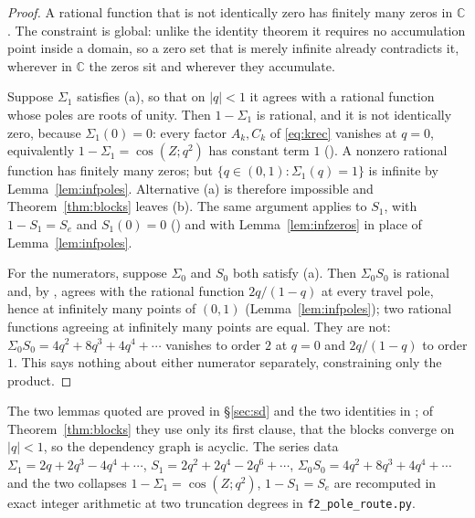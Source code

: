 \documentclass[11pt]{article}
\theoremstyle{plain}
\theoremstyle{definition}
\theoremstyle{remark}
\newcommand{\C}{\mathbb{C}}
\begin{document}
\begin{proof}
A rational function that is not identically zero has finitely many zeros in $\C$. The constraint is
global: unlike the identity theorem it requires no accumulation point inside a domain, so a zero set
that is merely infinite already contradicts it, wherever in $\C$ the zeros sit and wherever they
accumulate.

Suppose $\Sigma_1$ satisfies \textup{(a)}, so that on $|q|<1$ it agrees with a rational function
whose poles are roots of unity. Then $1-\Sigma_1$ is rational, and it is not identically zero,
because $\Sigma_1(0)=0$: every factor $A_k,C_k$ of \eqref{eq:krec} vanishes at $q=0$, equivalently
$1-\Sigma_1=\cos(Z;q^2)$ has constant term $1$ ({\cite[Proposition \textup{prop:qtrig}]{Bonfioli2026bA}}). A nonzero rational
function has finitely many zeros; but $\{q\in(0,1):\Sigma_1(q)=1\}$ is infinite by
Lemma~\ref{lem:infpoles}. Alternative \textup{(a)} is therefore impossible and
Theorem~\ref{thm:blocks} leaves \textup{(b)}. The same argument applies to $S_1$, with
$1-S_1=S_e$ and $S_1(0)=0$ ({\cite[Proposition \textup{prop:qtrig}]{Bonfioli2026bA}}) and with Lemma~\ref{lem:infzeros} in place
of Lemma~\ref{lem:infpoles}.

For the numerators, suppose $\Sigma_0$ and $S_0$ both satisfy \textup{(a)}. Then $\Sigma_0S_0$ is
rational and, by {\cite[Proposition ``the numerators do not vanish at the travel poles'', \textup{prop:numnonvanish}]{Bonfioli2026bA}}, agrees with the rational function
$2q/(1-q)$ at every travel pole, hence at infinitely many points of $(0,1)$
(Lemma~\ref{lem:infpoles}); two rational functions
agreeing at infinitely many points are equal. They are not: $\Sigma_0S_0=4q^2+8q^3+4q^4+\cdots$
vanishes to order $2$ at $q=0$ and $2q/(1-q)$ to order $1$. This says nothing about either numerator
separately, {\cite[\textup{(eq:numprod)}]{Bonfioli2026bA}} constraining only the product.
\end{proof}

\noindent The two lemmas quoted are proved in \S\ref{sec:sd} and the two identities in
{\cite[\S\,\textup{sec:qtrig}]{Bonfioli2026bA}}; of Theorem~\ref{thm:blocks} they use only its first clause, that the blocks
converge on $|q|<1$, so the dependency graph is acyclic. The series data
$\Sigma_1=2q+2q^3-4q^4+\cdots$, $S_1=2q^2+2q^4-2q^6+\cdots$, $\Sigma_0S_0=4q^2+8q^3+4q^4+\cdots$
and the two collapses $1-\Sigma_1=\cos(Z;q^2)$, $1-S_1=S_e$ are recomputed in exact integer
arithmetic at two truncation degrees in \texttt{f2\_pole\_route.py}.
\end{document}
